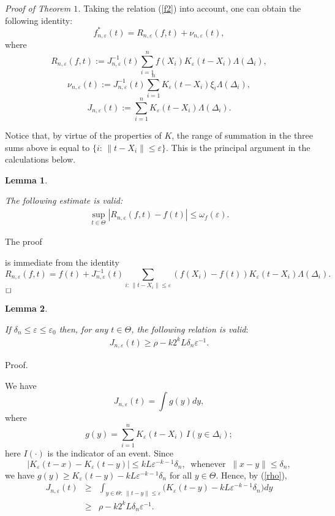 \documentclass[12pt]{article}
\theoremstyle{remark}
\begin{document}
{\it Proof of Theorem $1$.} Taking the relation (\ref{f2}) into account, one can obtain the following identity:
$$f^*_{n,\varepsilon}(t)=R_{n,\varepsilon}(f,t)+\nu_{n,\varepsilon}(t),
$$
where
$$R_{n,\varepsilon}(f,t):=J^{-1}_{n,\varepsilon}(t)\sum\limits_{i=1}^nf(X_{i})K_{\varepsilon}\left(t-X_{i}\right)
\Lambda(\Delta_i),$$
$$\nu_{n,\varepsilon}(t):=J^{-1}_{n,\varepsilon}(t)\sum\limits_{i=1}^nK_{\varepsilon}\left(t-X_{i}\right)\xi_{i}\Lambda(\Delta_i),$$
$$J_{n,\varepsilon}(t):=\sum\limits_{i=1}^nK_{\varepsilon}(t-X_{i})\Lambda(\Delta_i).
$$

Notice that, by virtue of the properties of $K$,
 the range of summation in the three sums above is equal to $\{i:\,\|t-X_{i}\|\le\varepsilon\}$.
This is the principal argument in the calculations below.


{\bf Lemma 1}. {\it The following estimate is valid:
\begin{eqnarray}\label{approx}
\sup_{t\in \Theta}|R_{n,\varepsilon}(f,t)-f(t)|\le\omega_f(\varepsilon).
\end{eqnarray}

The proof} is immediate from the identity
$$R_{n,\varepsilon}(f,t)=f(t)+J^{-1}_{n,\varepsilon}(t)\sum\limits_{i:\,\|t-X_{i}\|\le\varepsilon}(f(X_{i})-f(t))
K_{\varepsilon}\left(t-X_{i}\right)\Lambda(\Delta_i).
$$
$\hfill\Box$

{\bf Lemma 2}. {\it If $\delta_n\le\varepsilon\le\varepsilon_0$ then, for any $t\in \Theta$, the following relation is valid$:$
\begin{eqnarray*}\label{riemann}
J_{n,\varepsilon}(t)\ge \rho - k 2^k L  \delta_n \varepsilon^{-1}.
\end{eqnarray*}

Proof.}
We have
$$J_{n,\varepsilon}(t)=\int  g(y) dy,$$
where
$$g(y)=\sum\limits_{i=1}^nK_{\varepsilon}(t-X_{i})
\,I(y\in \Delta_i);$$
here $I(\cdot)$ is the indicator of an event.
Since
\begin{equation}\label{jne}
|K_{\varepsilon}\left(t-x\right)-K_{\varepsilon}\left(t-y\right)|\le kL\varepsilon^{-k-1}\delta_n,
 \  \mbox{ whenever }\  \|x-y\|\le \delta_n,
\end{equation}
we have
$g(y)\ge
K_{\varepsilon}(t-y)-kL\varepsilon^{-k-1}\delta_n
$ for all $y\in\Theta$.
Hence, by (\ref{rho}),
\begin{eqnarray*}
J_{n,\varepsilon}(t)&\ge&
\int_{y\in\Theta:\ \|t-y\|\le \varepsilon}
\big(K_{\varepsilon}(t-y)-kL\varepsilon^{-k-1}\delta_n\big) dy
\\
&\ge&
\rho - k 2^kL  \delta_n \varepsilon^{-1}.
\end{eqnarray*}
\end{document}
